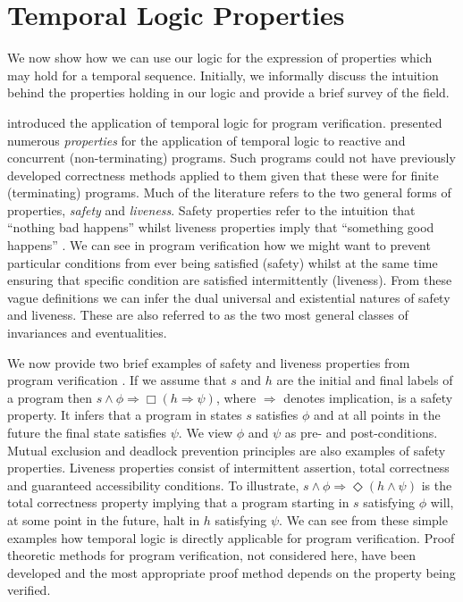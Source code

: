 \section{Temporal Logic Properties}\label{sec:tl_properties}


We now show how we can use our logic for the expression of properties
which may hold for a temporal sequence. Initially, we informally
discuss the intuition behind the properties holding in our logic and
provide a brief survey of the field.
\medskip

\cite{pnu77} introduced the application of temporal logic for program
verification. \cite{gps80} presented numerous {\em properties} for the
application of temporal logic to reactive and concurrent
(non-terminating) programs. Such programs could not have previously
developed correctness methods applied to them given that these were
for finite (terminating) programs. Much of the literature refers to
the two general forms of properties, {\em safety } and {\em
liveness}. Safety properties refer to the intuition that ``nothing
bad happens'' whilst liveness properties imply that ``something good
happens'' \cite{sis94}. We can see in program verification how we
might want to prevent particular conditions from ever being satisfied
(safety) whilst at the same time ensuring that specific condition are
satisfied intermittently (liveness). From these vague definitions we can
infer the dual universal and existential natures of safety and
liveness. These are also referred to as the two most general classes
of invariances and eventualities.

\medskip

We now provide two brief examples of safety and liveness properties
from program verification \cite{eme90}. If we assume that $s$ and $h$
are the initial and final labels of a program then $s \wedge \phi
\Rightarrow \Box (h \Rightarrow \psi)$, where $\Rightarrow$ denotes
implication, is a safety property. It infers that a program in states
$s$ satisfies $\phi$ and at all points in the future the final state
satisfies $\psi$. We view $\phi$ and $\psi$ as pre- and
post-conditions. Mutual exclusion and deadlock prevention principles are
also examples of safety properties.  Liveness properties consist of
intermittent assertion, total correctness and guaranteed accessibility
conditions. To illustrate, $s \wedge \phi \Rightarrow \Diamond (h
\wedge \psi)$ is the total correctness property implying that a
program starting in $s$ satisfying $\phi$ will, at some point in the
future, halt in  $h$ satisfying $\psi$. We can see from these simple
examples how temporal logic is directly applicable for program
verification. Proof theoretic methods for program verification, not
considered here, have been developed and the most appropriate proof
method depends on the property being verified.


